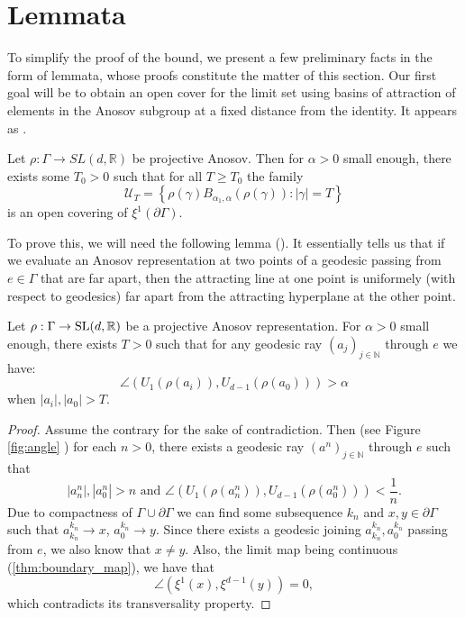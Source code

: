 \documentclass{report}
\begin{document}
\section{Lemmata}
To simplify the proof of the bound, we present a few preliminary facts in the form of lemmata, whose proofs constitute the matter of this section.
Our first goal will be to obtain an open cover for the limit set using basins of attraction of elements in the Anosov subgroup at a fixed distance from the identity.
It appears as \cite[Proposition 3.5]{pozzetti_anosov_2023}.
\begin{lemma}\label{lem:boundary_covering}
Let $\rho: \Gamma \to SL(d, \mathbb R)$ be projective Anosov.
Then for $\alpha > 0$ small enough, there exists some $T_0 > 0$ such that for all $T \geq T_0$ the family
\[
    \mathcal U_T = \left\{ \rho(\gamma) B_{\alpha_1, \alpha}(\rho(\gamma)) : |\gamma| = T \right\}
\]
is an open covering of $\xi^1(\partial \Gamma)$.
\end{lemma}
To prove this, we will need the following lemma (\cite[Lemma 2.4]{pozzetti_anosov_2023}).
It essentially tells us that if we evaluate an Anosov representation at two points of a geodesic passing from $e \in \Gamma$ that are far apart, then the attracting line at one point is uniformely (with respect to geodesics) far apart from the attracting hyperplane at the other point.
\begin{lemma}\label{lem:angle}
    Let $\rho: \Gamma \to \operatorname{{\mathrm{SL}}}(d, \mathbb R)$ be a projective Anosov representation.
    For $\alpha > 0$ small enough, there exists $T>0$ such that for any geodesic ray $(a_j)_{j \in \mathbb N}$ through $e$ we have:
    \[
        \angle(U_1(\rho(a_i)), U_{d-1}(\rho(a_0))) > \alpha
    \]
    when $|a_i|, |a_0| > T$.
\end{lemma}
\begin{proof}
Assume the contrary for the sake of contradiction.
Then (see Figure \ref{fig:angle} ) for each $n>0$, there exists a geodesic ray  $(a^n)_{j \in \mathbb N}$ through $e$ such that 
\[
    |a_n^n|, |a_0^n| > n \text{ and }
    \angle(U_1(\rho(a_n^n)), U_{d-1}(\rho(a_0^n))) < \frac{1}{n}.
\]
Due to compactness of $\Gamma \cup \partial \Gamma$ we can find some subsequence  ${k_n}$ and $x,y \in \partial \Gamma$ such that $a^{k_n}_{k_n} \to x$, $a^{k_n}_0 \to y$.
Since there exists a geodesic joining $a_{k_n}^{k_n}, a_0^{k_n}$ passing from $e$, we also know that $x\neq y$.
Also, the limit map being continuous (\cref{thm:boundary_map}), we have that
\[
    \angle (\xi^1(x), \xi^{d-1}(y)) = 0,
\]
which contradicts its transversality property.
\end{proof}
\end{document}
